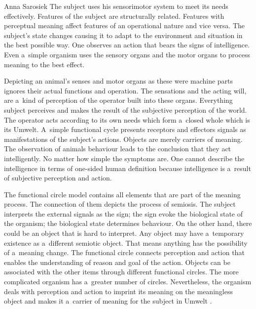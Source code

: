 \begin{artengenv}{Anna Sarosiek}
The subject uses his sensorimotor system to meet its needs effectively. Features of the subject are structurally related. Features with perceptual meaning affect features of an operational nature and vice versa. The subject’s state changes causing it to adapt to the environment and situation in the best possible way. One observes an action that bears the signs of intelligence. Even a~simple organism uses the sensory organs and the motor organs to process meaning to the best effect.

Depicting an animal’s senses and motor organs as these were machine parts ignores their actual functions and operation. The sensations and the acting will, are a~kind of perception of the operator built into these organs. Everything subject perceives and makes the result of the subjective perception of the world. The operator acts according to its own needs which form a~closed whole which is its Umwelt. A~simple functional cycle presents receptors and effectors signals as manifestations of the subject’s actions. Objects are merely carriers of meaning. The observation of animals behaviour leads to the conclusion that they act intelligently. No matter how simple the symptoms are. One cannot describe the intelligence in terms of one-sided human definition because intelligence is a~result of subjective perception and action.

The functional circle model contains all elements that are part of the meaning process. The connection of them depicts the process of semiosis. The subject interprets the external signals as the sign; the sign evoke the biological state of the organism; the biological state determines behaviour. On the other hand, there could be an object that is hard to interpret. Any object may have a~temporary existence as a~different semiotic object. That means anything has the possibility of a~meaning change. The functional circle connects perception and action that enables the understanding of reason and goal of the action. Objects can be associated with the other items through different functional circles. The more complicated organism has a~greater number of circles. Nevertheless, the organism deals with perception and action to imprint its meaning on the meaningless object and makes it a~carrier of meaning for the subject in Umwelt
\parencite[][p.110]{uexkull_streifzuge_1934}.%



\end{artengenv}
